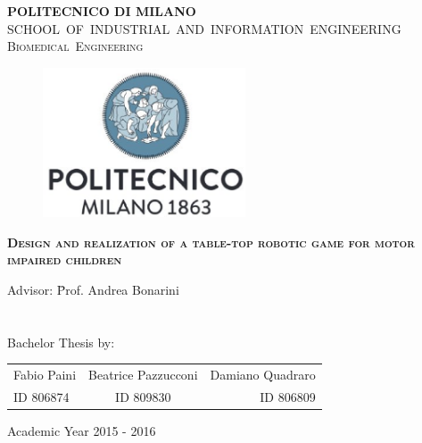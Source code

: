 \documentclass[a4paper,twoside]{book}
\let\cleardoublepage\clearpage
\begin{document}
\thispagestyle{empty} \cleardoublepage
\begin{center}
 \LARGE{\textbf{POLITECNICO DI MILANO}}\\
 \mbox{\large{SCHOOL OF INDUSTRIAL AND INFORMATION ENGINEERING}}\\
 \mbox{\Large{\textsc{Biomedical Engineering}} }
\end{center}
\addvspace{1cm}
\begin{figure}[h]
 \centering
 \includegraphics[width=6cm]{img/polilogo.eps}
\end{figure}
 
\addvspace{1cm}
 
\begin{center}
 \begin{large}
  \textbf{\textsc{Design and realization of a table-top robotic game for motor impaired children}}
 \end{large}
\end{center}
 
\addvspace{3cm}
\begin{Large}
  \begin{tabbing}
     Advisor: \hspace{4pt}  \= Prof. Andrea Bonarini\\
     \\
     \\
     Bachelor Thesis by:
  \end{tabbing}
   
 \begin{tabular}{ l c r }
  Fabio Paini & Beatrice Pazzucconi & Damiano Quadraro \\
  ID 806874 & ID 809830 & ID 806809 \\
 \end{tabular}
 
     \vfill
  \begin{center}
    Academic Year 2015 - 2016
  \end{center}
 
\end{Large}
\newpage
\end{document}
